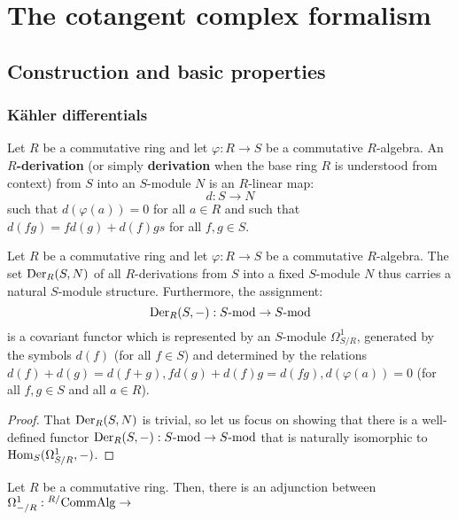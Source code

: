 \section{The cotangent complex formalism}
    \subsection{Construction and basic properties}
        \subsubsection{K\"ahler differentials} \label{subsubsection: kahler_differentials}
            \begin{definition} \label{def: kahler_differentials}
                Let $R$ be a commutative ring and let $\varphi: R \to S$ be a commutative $R$-algebra. An \textbf{$R$-derivation} (or simply \textbf{derivation} when the base ring $R$ is understood from context) from $S$ into an $S$-module $N$ is an $R$-linear map:
                    $$d: S \to N$$
                such that $d(\varphi(a)) = 0$ for all $a \in R$ and such that $d(fg) = fd(g) + d(f)gs$ for all $f, g \in S$.
            \end{definition}
            \begin{lemma} \label{lemma: modules_of_derivations}
                Let $R$ be a commutative ring and let $\varphi: R \to S$ be a commutative $R$-algebra. The set $\mathrm{Der}_R(S, N)$ of all $R$-derivations from $S$ into a fixed $S$-module $N$ thus carries a natural $S$-module structure. Furthermore, the assignment:
                    $$\mathrm{Der}_R(S, -): S\text{-}\mathrm{mod} \to S\text{-}\mathrm{mod}$$
                is a covariant functor which is represented by an $S$-module $\Omega^1_{S/R}$, generated by the symbols $d(f)$ (for all $f \in S$) and determined by the relations $d(f) + d(g) = d(f + g), fd(g) + d(f)g = d(fg), d(\varphi(a)) = 0$ (for all $f, g \in S$ and all $a \in R$).
            \end{lemma}
                \begin{proof}
                    That $\mathrm{Der}_R(S, N)$ is trivial, so let us focus on showing that there is a well-defined functor $\mathrm{Der}_R(S, -): S\text{-}\mathrm{mod} \to S\text{-}\mathrm{mod}$ that is naturally isomorphic to $\mathrm{Hom}_S(\Omega^1_{S/R}, -)$. 
                \end{proof}
            \begin{theorem} \label{theorem: kahler_differentials_universal_property}
                Let $R$ be a commutative ring. Then, there is an adjunction between $\Omega^1_{-/R}: {}^{R/}\mathrm{Comm}\mathrm{Alg} \to $ 
            \end{theorem}
            
